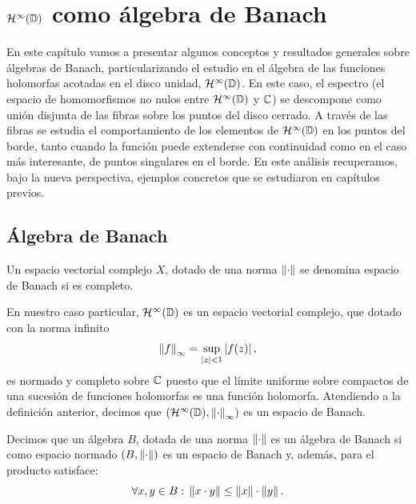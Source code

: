 \chapter{$\mathcal{H}^{\infty}(\mathbb{D})$ como álgebra de Banach}
\label{cap:banach}

En este capítulo vamos a presentar algunos conceptos y resultados generales sobre álgebras de Banach, particularizando el estudio en el álgebra de las funciones holomorfas acotadas en el disco unidad, $\mathcal{H}^{\infty}(\mathbb{D})$. En este caso, el espectro (el espacio de homomorfismos no nulos entre $\mathcal{H}^{\infty}(\mathbb{D})$ y $\mathbb{C}$) se descompone como unión disjunta de las fibras sobre los puntos del disco cerrado. A través de las fibras se estudia el comportamiento de los elementos de $\mathcal{H}^{\infty}(\mathbb{D})$ en los puntos del borde, tanto cuando la función puede extenderse con continuidad como en el caso más interesante, de puntos singulares en el borde. En este análisis recuperamos, bajo la nueva perspectiva, ejemplos concretos que se estudiaron en capítulos previos. \\

\section{Álgebra de Banach}

\begin{definition}
    Un espacio vectorial complejo $X$, dotado de una norma $\left\lVert\cdot\right\rVert$ se denomina espacio de Banach si es completo.
\end{definition}

\medskip

En nuestro caso particular, $\mathcal{H}^{\infty}(\mathbb{D})$ es un espacio vectorial complejo, que dotado con la norma infinito
\begin{equation*}
    \left\lVert f\right\rVert_{\infty} = \sup_{\left\lvert z\right\rvert < 1} \left\lvert f(z)\right\rvert,
\end{equation*}
es normado y completo sobre $\mathbb{C}$ puesto que el límite uniforme sobre compactos de una sucesión de funciones holomorfas es una función holomorfa. Atendiendo a la definición anterior, decimos que  $(\mathcal{H}^{\infty}(\mathbb{D}), \left\lVert\cdot\right\rVert_{\infty})$ es un espacio de Banach. \\

\begin{definition}
    Decimos que un álgebra $B$, dotada de una norma $\left\lVert\cdot\right\rVert$ es un álgebra de Banach si como espacio normado $(B, \left\lVert\cdot\right\rVert)$ es un espacio de Banach y, además, para el producto satisface:
    \begin{equation*}
        \forall x, y \in B: \, \left\lVert x \cdot y\right\rVert \leq \left\lVert x\right\rVert \cdot \left\lVert y\right\rVert.
    \end{equation*}
\end{definition}

